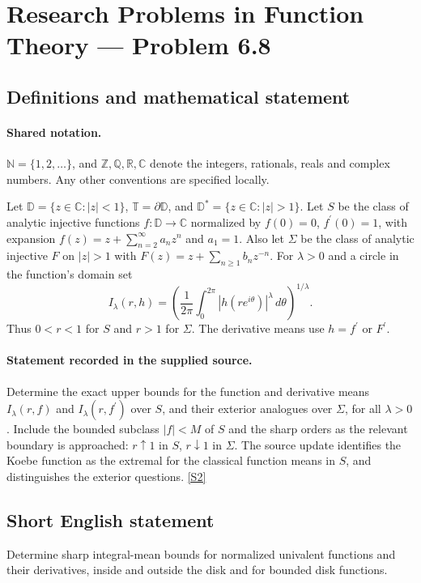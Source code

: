 \documentclass[11pt]{book}
\newcommand{\sref}[2]{\hyperlink{source:#1:#2}{[S#2]}}
\begin{document}
\section{Research Problems in Function Theory — Problem 6.8}\label{statement}

\subsection{Definitions and mathematical statement}

\paragraph{Shared notation.}$\mathbb N=\{1,2,\ldots\}$, and $\mathbb Z,\mathbb Q,\mathbb R,\mathbb C$ denote the integers, rationals, reals and complex numbers. Any other conventions are specified locally.


Let $\mathbb D=\{z\in\mathbb C:|z|<1\}$, $\mathbb T=\partial\mathbb D$, and $\mathbb D^*=\{z\in\mathbb C:|z|>1\}$. Let $S$ be the class of analytic injective functions $f:\mathbb D\to\mathbb C$ normalized by $f(0)=0$, $f^{\prime}(0)=1$, with expansion $f(z)=z+\sum_{n=2}^{\infty}a_nz^n$ and $a_1=1$. Also let $\Sigma$ be the class of analytic injective $F$ on $|z|>1$ with $F(z)=z+\sum_{n\ge1}b_nz^{-n}$. For $\lambda>0$ and a circle in the function’s domain set \[I_\lambda(r,h)=\left(\frac1{2\pi}\int_0^{2\pi}|h(re^{i\theta})|^{\lambda}\,d\theta\right)^{1/\lambda}.\] Thus $0<r<1$ for $S$ and $r>1$ for $\Sigma$. The derivative means use $h=f^{\prime}$ or $F^{\prime}$.
\paragraph{Statement recorded in the supplied source.}
Determine the exact upper bounds for the function and derivative means $I_\lambda(r,f)$ and $I_\lambda(r,f^{\prime})$ over $S$, and their exterior analogues over $\Sigma$, for all $\lambda>0$. Include the bounded subclass $|f|<M$ of $S$ and the sharp orders as the relevant boundary is approached: $r\uparrow1$ in $S$, $r\downarrow1$ in $\Sigma$. The source update identifies the Koebe function as the extremal for the classical function means in $S$, and distinguishes the exterior questions. \sref{statement}{2}
\subsection{Short English statement}
Determine sharp integral-mean bounds for normalized univalent functions and their derivatives, inside and outside the disk and for bounded disk functions.
\end{document}
